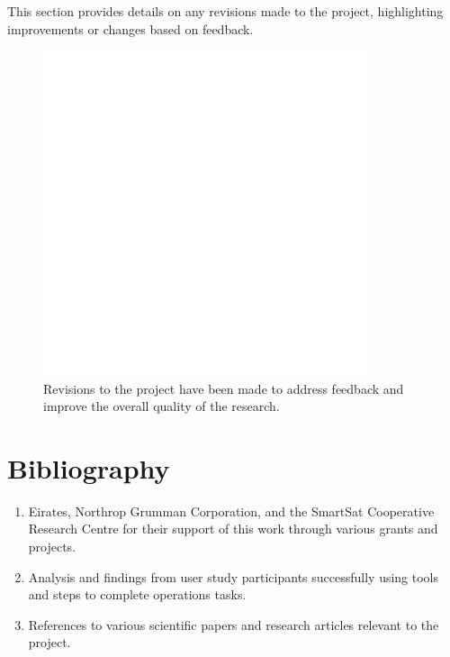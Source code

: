 \documentclass[a4paper,12pt]{article}
\begin{document}
This section provides details on any revisions made to the project, highlighting improvements or changes based on feedback.

\begin{figure}[htbp]
    \centering
    \includegraphics[width=0.85\textwidth]{images/comment_on_resubmission_(if_applicable)_img_1.png}
    \caption{Revisions to the project have been made to address feedback and improve the overall quality of the research.}
    \label{fig:comment_on_resubmission_(if_applicable)_1}
\end{figure}

\newpage

\section{Bibliography}

\begin{enumerate}
    \item Eirates, Northrop Grumman Corporation, and the SmartSat Cooperative Research Centre for their support of this work through various grants and projects.
    \item Analysis and findings from user study participants successfully using tools and steps to complete operations tasks.
    \item References to various scientific papers and research articles relevant to the project.
\end{enumerate}
\end{document}
